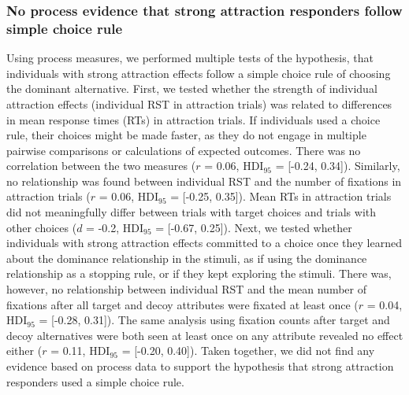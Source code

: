 \documentclass[11pt, a4paper]{article}
\begin{document}
\begin{refsection}
\subsubsection*{No process evidence that strong attraction responders follow simple choice rule}
Using process measures, we performed multiple tests of the hypothesis, that individuals with strong attraction effects follow a simple choice rule of choosing the dominant alternative. First, we tested whether the strength of individual attraction effects (individual RST in attraction trials) was related to differences in mean response times (RTs) in attraction trials. If individuals used a choice rule, their choices might be made faster, as they do not engage in multiple pairwise comparisons or calculations of expected outcomes. There was no correlation between the two measures ($r$ = 0.06, HDI$_{95}$ = [-0.24, 0.34]). Similarly, no relationship was found between individual RST and the number of fixations in attraction trials ($r$ = 0.06, HDI$_{95}$ = [-0.25, 0.35]). Mean RTs in attraction trials did not meaningfully differ between trials with target choices and trials with other choices ($d$ = -0.2, HDI$_{95}$ = [-0.67, 0.25]). Next, we tested whether individuals with strong attraction effects committed to a choice once they learned about the dominance relationship in the stimuli, as if using the dominance relationship as a stopping rule, or if they kept exploring the stimuli. There was, however, no relationship between individual RST and the mean number of fixations after all target and decoy attributes were fixated at least once ($r$ = 0.04, HDI$_{95}$ = [-0.28, 0.31]). The same analysis using fixation counts after target and decoy alternatives were both seen at least once on any attribute revealed no effect either ($r$ = 0.11, HDI$_{95}$ = [-0.20, 0.40]).
Taken together, we did not find any evidence based on process data to support the hypothesis that strong attraction responders used a simple choice rule.

\renewcommand*{\bibfont}{\small}
\printbibliography[title=Supplementary Information References]

\end{refsection} %
\renewcommand{\thepage}{S\arabic{page}}
\end{document}
